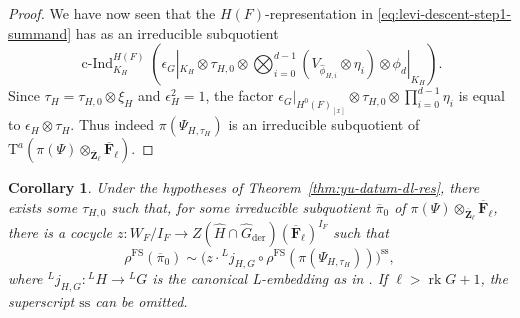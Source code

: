\documentclass[reqno]{amsart}
\numberwithin{equation}{subsection}
\newcommand{\F}{\mathbf{F}}
\newcommand{\Z}{\mathbf{Z}}
\newcommand{\ol}[1]{\overline{#1}}
\newcommand{\wh}[1]{\widehat{#1}}
\newcommand{\co}{\colon}
\newcommand{\ld}{{}^L}
\DeclareMathOperator{\FS}{FS}
\DeclareMathOperator{\cInd}{c-Ind}
\DeclareMathOperator{\der}{der}
\DeclareMathOperator{\rk}{rk}
\newcommand{\rT}{\ensuremath{\mathrm{T}}\xspace}
\renewcommand{\ss}{\mathrm{ss}}
\newtheorem{cor}[thm]{Corollary}
\theoremstyle{remark}
\numberwithin{equation}{subsection}
\numberwithin{figure}{subsection}
\begin{document}
\begin{proof}
We have now seen that the $H(F)$-representation in \eqref{eq:levi-descent-step1-summand} has as an irreducible subquotient
\[
\cInd_{K_H}^{H(F)}(\epsilon_G|_{K_H}\otimes \tau_{H,0}\otimes \bigotimes_{i=0}^{d-1}(V_{\wh\phi_{H,i}}\otimes\eta_i)\otimes \phi_d|_{K_H}).
\]
Since $\tau_H = \tau_{H,0}\otimes\xi_H$ and $\epsilon_H^2=1$, the factor $\epsilon_G|_{H^0(F)_{[x]}}\otimes \tau_{H,0}\otimes\prod_{i=0}^{d-1}\eta_i$ is equal to $\epsilon_H\otimes\tau_H$. Thus indeed $\pi(\Psi_{H,\tau_H})$ is an irreducible subquotient of $\rT^a(\pi(\Psi) \otimes_{\ol\Z_\ell} \ol\F_\ell)$.
\end{proof}

\begin{cor}\label{cor:yu-datum-dl-res-parameter}
Under the hypotheses of Theorem~\ref{thm:yu-datum-dl-res}, there exists some $\tau_{H,0}$ such that, for some irreducible subquotient $\ol\pi_0$ of $\pi(\Psi) \otimes_{\ol\Z_\ell} \ol\F_\ell$, there is a cocycle $z\co W_F/I_F \to Z(\wh H \cap \wh G_{\der})(\ol\F_\ell)^{I_F}$ such that 
\begin{equation}\label{eqn:fs-unram-modular-ss}
\rho^{\FS}(\ol\pi_0) \sim \bigl(z \cdot \ld j_{H,G} \circ \rho^{\FS}(\pi(\Psi_{H,\tau_H}))\bigr)^{\ss},
\end{equation}
where $\ld j_{H,G}\co \ld H \to \ld G$ is the canonical L-embedding as in \cite[Definition~4.5.1]{CF26a}. If $\ell>\rk G+1$, the superscript $\ss$ can be omitted.
\end{cor}
\end{document}

